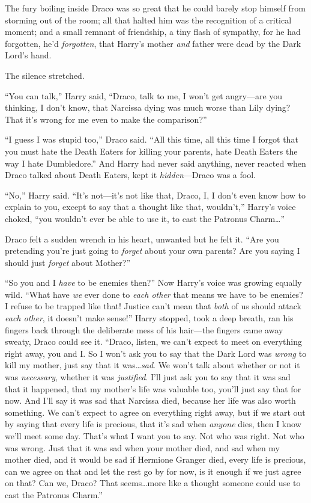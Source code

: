 \later

The fury boiling inside Draco was so great that he could barely stop himself from storming out of the room; all that halted him was the recognition of a critical moment; and a small remnant of friendship, a tiny flash of sympathy, for he had forgotten, he’d \emph{forgotten}, that Harry’s mother \emph{and} father were dead by the Dark Lord’s hand.

The silence stretched.

“You can talk,” Harry said, “Draco, talk to me, I won’t get angry—are you thinking, I don’t know, that Narcissa dying was much worse than Lily dying? That it’s wrong for me even to make the comparison?”

“I guess I was stupid too,” Draco said. “All this time, all this time I forgot that you must hate the Death Eaters for killing your parents, hate Death Eaters the way I hate Dumbledore.” And Harry had never said anything, never reacted when Draco talked about Death Eaters, kept it \emph{hidden}—Draco was a fool.

“No,” Harry said. “It’s not—it’s not like that, Draco, I, I don’t even know how to explain to you, except to say that a thought like that, wouldn’t,” Harry’s voice choked, “you wouldn’t ever be able to use it, to cast the Patronus Charm…”

Draco felt a sudden wrench in his heart, unwanted but he felt it. “Are you pretending you’re just going to \emph{forget} about your own parents? Are you saying I should just \emph{forget} about Mother?”

“So you and I \emph{have} to be enemies then?” Now Harry’s voice was growing equally wild. “What have \emph{we} ever done to \emph{each other} that means we have to be enemies? I refuse to be trapped like that! Justice can’t mean that \emph{both} of us should attack \emph{each other}, it doesn’t make sense!” Harry stopped, took a deep breath, ran his fingers back through the deliberate mess of his hair—the fingers came away sweaty, Draco could see it. “Draco, listen, we can’t expect to meet on everything right away, you and I\@. So I won’t ask you to say that the Dark Lord was \emph{wrong} to kill my mother, just say that it was…\emph{sad}. We won’t talk about whether or not it was \emph{necessary}, whether it was \emph{justified}. I’ll just ask you to say that it was sad that it happened, that my mother’s life was valuable too, you’ll just say that for now. And I’ll say it was sad that Narcissa died, because her life was also worth something. We can’t expect to agree on everything right away, but if we start out by saying that every life is precious, that it’s sad when \emph{anyone} dies, then I know we’ll meet some day. That’s what I want you to say. Not who was right. Not who was wrong. Just that it was sad when your mother died, and sad when my mother died, and it would be sad if Hermione Granger died, every life is precious, can we agree on that and let the rest go by for now, is it enough if we just agree on that? Can we, Draco? That seems…more like a thought someone could use to cast the Patronus Charm.”

